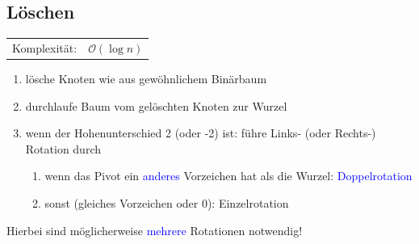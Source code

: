 \documentclass[12pt,a4paper]{article}
\begin{document}
\subsection{Löschen}
\begin{tabularx}{\textwidth}{l l}
	Komplexität: &$\mathcal{O}(\log n)$\\
\end{tabularx}
\begin{enumerate}
	\item lösche Knoten wie aus gewöhnlichem Binärbaum
	\item durchlaufe Baum vom gelöschten Knoten zur Wurzel
	\item wenn der Hohenunterschied 2 (oder -2) ist: führe Links- (oder Rechts-) Rotation durch
	\begin{enumerate}
		\item wenn das Pivot ein \textcolor{blue}{anderes} Vorzeichen hat als die Wurzel: \textcolor{blue}{Doppelrotation}
		\item sonst (gleiches Vorzeichen oder 0): Einzelrotation
	\end{enumerate}
\end{enumerate}
Hierbei sind möglicherweise \textcolor{blue}{mehrere} Rotationen notwendig!
\end{document}
